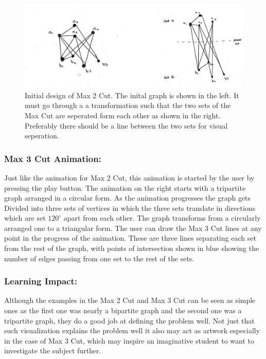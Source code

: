 \begin{figure}[h]
\centering
\includegraphics[scale=0.2]{maxcutdes}
\caption{
         Initial design of Max 2 Cut. The inital graph is shown in the left. It
         must go through a a transformation such that the two sets of the Max
         Cut are seperated form each other as shown in the right. Preferably
         there should be a line between the two sets for visual seperation.
        }
\end{figure}

\subsubsection{Max 3 Cut Animation:}
\label{story: max3cut}
Just like the animation for Max 2 Cut, this animation is started by the user by
pressing the play button. The animation on the right starts with a tripartite
graph arranged in a circular form. As the animation progresses the graph gets
Divided into three sets of vertices in which the three sets translate in
directions which are set $120^{\circ}$ apart from each other. The graph
transforms from a circularly arranged one to a triangular form. The user can
draw the Max 3 Cut lines at any point in the progress of the animation.  These
are three lines separating each set from the rest of the graph, with points of
intersection shown in blue showing the number of edges passing from one set to
the rest of the sets.

\subsubsection{Learning Impact:}
Although the examples in the Max 2 Cut and Max 3 Cut can be seen as simple ones
as the first one was nearly a bipartite graph and the second one was a
tripartite graph, they do a good job at defining the problem well. 
Not just that such visualization explains the problem well it also may act
as artwork especially in the case of Max 3 Cut, which may inspire an
imaginative student to want to investigate the subject further.


